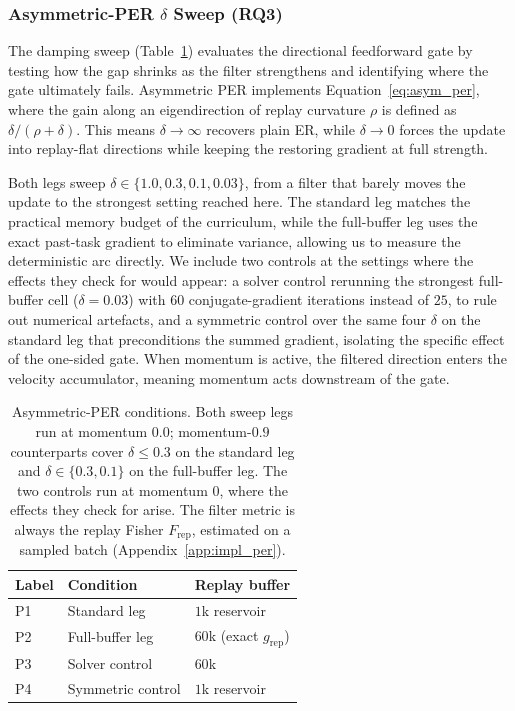\subsubsection{Asymmetric-PER \texorpdfstring{$\delta$}{delta} Sweep (RQ3)}
\label{subsec:per_asym}

The damping sweep (Table~\ref{tab:per}) evaluates the directional feedforward gate by testing how the gap shrinks as the filter strengthens and identifying where the gate ultimately fails. Asymmetric PER implements Equation~\eqref{eq:asym_per}, where the gain along an eigendirection of replay curvature $\rho$ is defined as $\delta/(\rho+\delta)$. This means $\delta \to \infty$ recovers plain ER, while $\delta \to 0$ forces the update into replay-flat directions while keeping the restoring gradient at full strength.

Both legs sweep $\delta \in \{1.0, 0.3, 0.1, 0.03\}$, from a filter that barely moves the update to the strongest setting reached here. The standard leg matches the practical memory budget of the curriculum, while the full-buffer leg uses the exact past-task gradient to eliminate variance, allowing us to measure the deterministic arc directly. We include two controls at the settings where the effects they check for would appear: a solver control rerunning the strongest full-buffer cell ($\delta = 0.03$) with $60$ conjugate-gradient iterations instead of $25$, to rule out numerical artefacts, and a symmetric control over the same four $\delta$ on the standard leg that preconditions the summed gradient, isolating the specific effect of the one-sided gate. When momentum is active, the filtered direction enters the velocity accumulator, meaning momentum acts downstream of the gate.

\begin{table}[htbp]
    \centering
    \small
    \begin{tabular}{@{}l l l@{}}
        \hline
        Label & Condition         & Replay buffer                  \\
        \hline
        P1    & Standard leg      & $1$k reservoir                 \\
        P2    & Full-buffer leg   & $60$k (exact $g_{\text{rep}}$) \\
        P3    & Solver control    & $60$k                          \\
        P4    & Symmetric control & $1$k reservoir                 \\
        \hline
    \end{tabular}
    \caption{Asymmetric-PER conditions. Both sweep legs run at momentum $0.0$; momentum-$0.9$ counterparts cover $\delta \le 0.3$ on the standard leg and $\delta \in \{0.3, 0.1\}$ on the full-buffer leg. The two controls run at momentum $0$, where the effects they check for arise. The filter metric is always the replay Fisher $F_{\text{rep}}$, estimated on a sampled batch (Appendix~\ref{app:impl_per}).}
    \label{tab:per}
\end{table}

